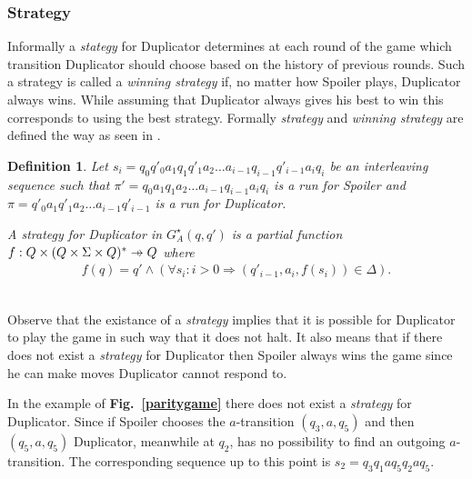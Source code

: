 \documentclass[12pt,oneside,bibliography=totoc,abstracton]{scrartcl}
\newcommand{\pto}{\mathrel{\ooalign{\hfil$\mapstochar$\hfil\cr$\to$\cr}}}
\newcommand{\figref}[1]{\textbf{Fig.~\ref{#1}}}
\newcommand{\libref}[1]{\textbf{\cite{#1}}}
\newtheorem{mydef}{Definition}
\begin{document}
\subsubsection{Strategy}
Informally a \textit{stategy} for Duplicator determines at each round of the game which transition Duplicator should
choose based on the history of previous rounds. Such a strategy is called a \textit{winning strategy} if, no matter
how Spoiler plays, Duplicator always wins. While assuming that Duplicator always gives his best to win this
corresponds to using the best strategy. Formally \textit{strategy} and \textit{winning strategy}
are defined the way as seen in \libref{simulation_general}.\\
\begin{mydef}\label{def_strategy}
	Let $s_i = q_0q'_0a_1q_1q'_1a_2 \ldots a_{i-1}q_{i-1}q'_{i-1}a_iq_i$ be an
	\textnormal{interleaving sequence} such that
	$\pi' = q_0a_1q_1a_2 \ldots a_{i-1}q_{i-1}a_iq_i$ is a run for Spoiler and
	$\pi = q'_0a_1q'_1a_2 \ldots a_{i-1}q'_{i-1}$ is a run for Duplicator.
	
	A \textnormal{strategy} for Duplicator in $G^{\star}_A(q, q')$ is a partial function
	$f : Q \times (Q \times \Sigma \times Q)^* \pto Q$ where
	\begin{align*}
		f(q) = q' \land (\forall s_i : i > 0 \Rightarrow (q'_{i-1}, a_i, f(s_i)) \in \Delta).
	\end{align*}
\end{mydef}\quad\\
Observe that the existance of a \textit{strategy} implies that it is possible for Duplicator
to play the game in such way that it does not halt. It also means that if there does not exist
a \textit{strategy} for Duplicator then Spoiler always wins the game since he can
make moves Duplicator cannot respond to.

In the example of \figref{paritygame} there does not exist a \textit{strategy} for Duplicator. Since if Spoiler
chooses the $a$-transition $(q_3, a, q_5)$ and then $(q_5, a, q_5)$ Duplicator, meanwhile at $q_2$,
has no possibility to find an outgoing $a$-transition.
The corresponding sequence up to this point is $s_2 = q_3q_1aq_5q_2aq_5$.
\end{document}
